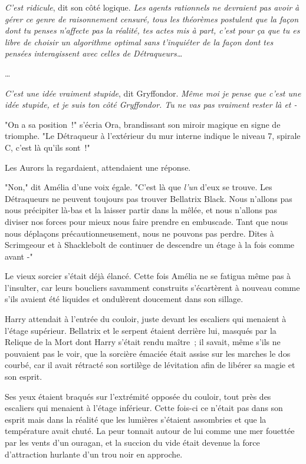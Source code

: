 \emph{C'est ridicule}, dit son côté logique. \emph{Les agents rationnels ne devraient pas avoir à gérer ce genre de raisonnement censuré, tous les théorèmes postulent que la façon dont tu penses n'affecte pas la réalité, tes actes mis à part, c'est pour ça que tu es libre de choisir un algorithme optimal sans t'inquiéter de la façon dont tes pensées interagissent avec celles de Détraqueurs…}

…

\emph{C'est une idée vraiment stupide}, dit Gryffondor. \emph{Même moi je pense que c'est une idée stupide, et je suis ton côté Gryffondor. Tu ne vas pas vraiment rester là et -}

\later

"On a sa position~!" s'écria Ora, brandissant son miroir magique en signe de triomphe. "Le Détraqueur à l'extérieur du mur interne indique le niveau 7, spirale C, c'est là qu'ils sont~!"

Les Aurors la regardaient, attendaient une réponse.

"Non," dit Amélia d'une voix égale. "C'est là que \emph{l'un} d'eux se trouve. Les Détraqueurs ne peuvent toujours pas trouver Bellatrix Black. Nous n'allons pas nous précipiter là-bas et la laisser partir dans la mêlée, et nous n'allons pas diviser nos forces pour mieux nous faire prendre en embuscade. Tant que nous nous déplaçons précautionneusement, nous ne pouvons pas perdre. Dites à Scrimgeour et à Shacklebolt de continuer de descendre un étage à la fois comme avant -"

Le vieux sorcier s'était déjà élancé. Cette fois Amélia ne se fatigua même pas à l'insulter, car leurs boucliers savamment construits s'écartèrent à nouveau comme s'ils avaient été liquides et ondulèrent doucement dans son sillage.

\later

Harry attendait à l'entrée du couloir, juste devant les escaliers qui menaient à l'étage supérieur. Bellatrix et le serpent étaient derrière lui, masqués par la Relique de la Mort dont Harry s'était rendu maître~; il savait, même s'ils ne pouvaient pas le voir, que la sorcière émaciée était assise sur les marches le dos courbé, car il avait rétracté son sortilège de lévitation afin de libérer sa magie et son esprit.

Ses yeux étaient braqués sur l'extrémité opposée du couloir, tout près des escaliers qui menaient à l'étage inférieur. Cette fois-ci ce n'était pas dans son esprit mais dans la réalité que les lumières s'étaient assombries et que la température avait chuté. La peur tonnait autour de lui comme une mer fouettée par les vents d'un ouragan, et la succion du vide était devenue la force d'attraction hurlante d'un trou noir en approche.

